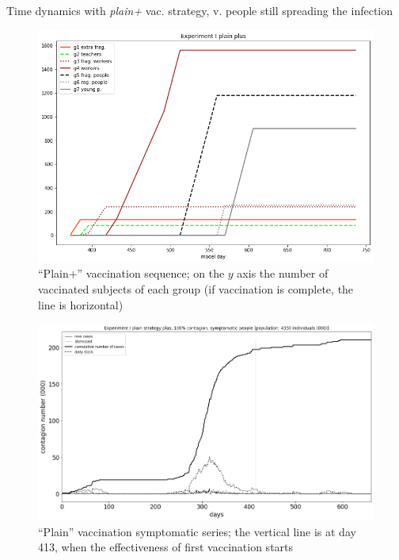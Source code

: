 \documentclass[9pt]{beamer}
\begin{document}
\begin{frame}{Time dynamics with \emph{plain+} vac. strategy, v. people still spreading the infection}

\begin{figure}[H]
\center
\includegraphics[scale=0.16]{Experiment_I_plainPlusVaccinationSequence.png} %

\caption{``Plain+'' vaccination sequence; on the $y$ axis the number of vaccinated subjects of each group (if vaccination is complete, the line is horizontal)} 
\label{Experiment_I_plainVaccinationSequence}
\end{figure}

\begin{figure}[H]
\center
\includegraphics[scale=0.16]{Experiment_I_1_plainPlus_symptomatic_series.png} 

\caption{``Plain'' vaccination symptomatic series; the vertical line is at day 413, when the effectiveness of first vaccination starts} 
\label{Experiment_I_plainSymptomaticSeries}
\end{figure}



\end{frame}
\end{document}
